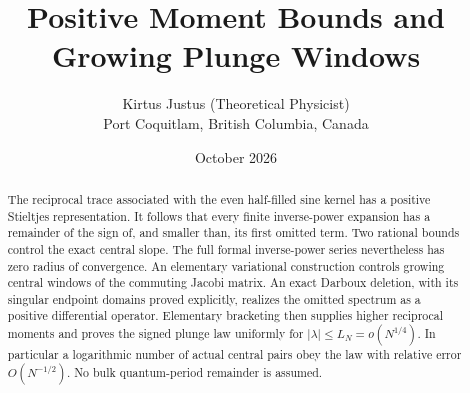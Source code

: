 \documentclass[10pt]{article}
\title{Positive Moment Bounds and Growing Plunge Windows}
\author{Kirtus Justus (Theoretical Physicist)\\\small Port Coquitlam, British Columbia, Canada}
\date{October 2026}
\begin{document}
\maketitle
\begin{abstract}
The reciprocal trace associated with the even half-filled sine kernel has a
positive Stieltjes representation. It follows that every finite inverse-power
expansion has a remainder of the sign of, and smaller than, its first omitted
term. Two rational bounds control the exact central slope. The full formal
inverse-power series nevertheless has zero radius of convergence. An elementary
variational construction controls growing central windows of the commuting
Jacobi matrix. An exact Darboux deletion, with its singular endpoint domains
proved explicitly, realizes the omitted spectrum as a positive differential
operator. Elementary bracketing then supplies higher reciprocal moments and
proves the signed plunge law uniformly for $|\lambda|\le L_N=o(N^{1/4})$.
In particular a logarithmic number of actual central pairs obey the law with
relative error $O(N^{-1/2})$. No bulk quantum-period remainder is assumed.
\end{abstract}
\end{document}
